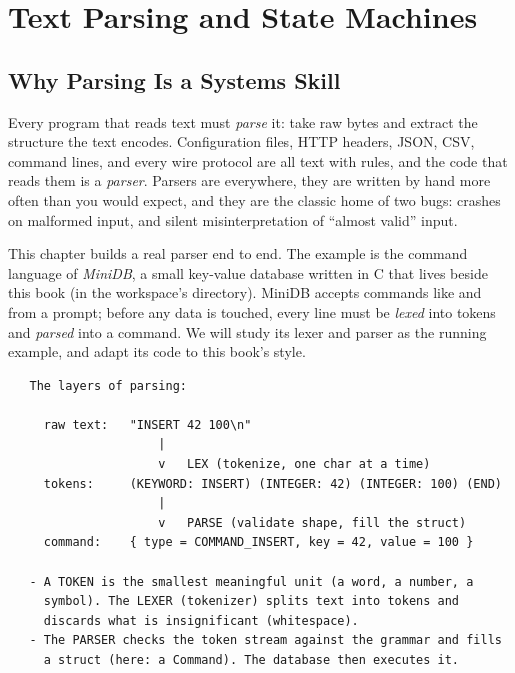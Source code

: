
\chapter{Text Parsing and State Machines}

\section{Why Parsing Is a Systems Skill}

Every program that reads text must \emph{parse} it: take raw bytes and
extract the structure the text encodes. Configuration files, HTTP
headers, JSON, CSV, command lines, and every wire protocol are all
text with rules, and the code that reads them is a \emph{parser}.
Parsers are everywhere, they are written by hand more often than you
would expect, and they are the classic home of two bugs: crashes on
malformed input, and silent misinterpretation of ``almost valid''
input.

This chapter builds a real parser end to end. The example is the
command language of \emph{MiniDB}, a small key-value database written
in C that lives beside this book (in the workspace's
 directory). MiniDB accepts
commands like  and  from a prompt;
before any data is touched, every line must be \emph{lexed} into
tokens and \emph{parsed} into a command. We will study its lexer and
parser as the running example, and adapt its code to this book's
style.

\begin{verbatim}
   The layers of parsing:

     raw text:   "INSERT 42 100\n"
                     |
                     v   LEX (tokenize, one char at a time)
     tokens:     (KEYWORD: INSERT) (INTEGER: 42) (INTEGER: 100) (END)
                     |
                     v   PARSE (validate shape, fill the struct)
     command:    { type = COMMAND_INSERT, key = 42, value = 100 }

   - A TOKEN is the smallest meaningful unit (a word, a number, a
     symbol). The LEXER (tokenizer) splits text into tokens and
     discards what is insignificant (whitespace).
   - The PARSER checks the token stream against the grammar and fills
     a struct (here: a Command). The database then executes it.
\end{verbatim}

